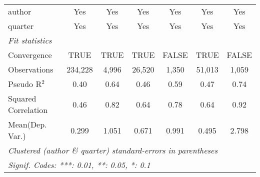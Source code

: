 \begin{tabular}{lcccccc}
   author                                                     & Yes          & Yes           & Yes           & Yes           & Yes           & Yes\\  
   quarter                                                    & Yes          & Yes           & Yes           & Yes           & Yes           & Yes\\  
   \midrule
   \emph{Fit statistics}\\
   Convergence                                                &TRUE          & TRUE          & TRUE          & FALSE         & TRUE          & FALSE\\  
   Observations                                               & 234,228      & 4,996         & 26,520        & 1,350         & 51,013        & 1,059\\  
   Pseudo R$^2$                                               & 0.40         & 0.64          & 0.46          & 0.59          & 0.47          & 0.74\\  
   Squared Correlation                                        & 0.46         & 0.82          & 0.64          & 0.78          & 0.64          & 0.92\\  
Mean(Dep. Var.) & 0.299 & 1.051 & 0.671 & 0.991 & 0.495 & 2.798 \\
   \midrule \midrule
   \multicolumn{7}{l}{\emph{Clustered (author \& quarter) standard-errors in parentheses}}\\
   \multicolumn{7}{l}{\emph{Signif. Codes: ***: 0.01, **: 0.05, *: 0.1}}\\
\end{tabular}
\par\endgroup
